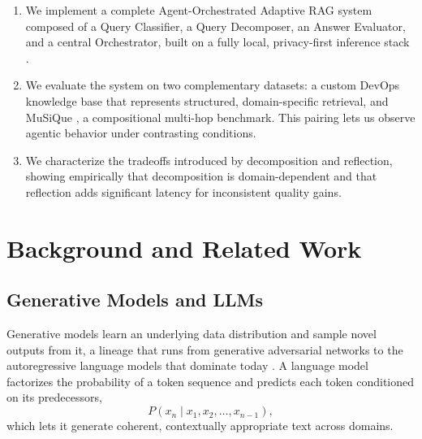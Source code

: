\documentclass[conference]{IEEEtran}
\begin{document}
\begin{enumerate}
  \item We implement a complete Agent-Orchestrated Adaptive RAG system composed of a Query Classifier, a Query Decomposer, an Answer Evaluator, and a central Orchestrator, built on a fully local, privacy-first inference stack \cite{meta2024llama3, gerganov2023gguf}.
  \item We evaluate the system on two complementary datasets: a custom DevOps knowledge base that represents structured, domain-specific retrieval, and MuSiQue \cite{trivedi2022musique}, a compositional multi-hop benchmark. This pairing lets us observe agentic behavior under contrasting conditions.
  \item We characterize the tradeoffs introduced by decomposition and reflection, showing empirically that decomposition is domain-dependent and that reflection adds significant latency for inconsistent quality gains.
\end{enumerate}

\section{Background and Related Work}

\subsection{Generative Models and LLMs}
Generative models learn an underlying data distribution and sample novel outputs from it, a lineage that runs from generative adversarial networks \cite{goodfellow2014gan, gui2021gansurvey} to the autoregressive language models that dominate today \cite{brown2020gpt3}. A language model factorizes the probability of a token sequence and predicts each token conditioned on its predecessors,
\begin{equation}
P(x_n \mid x_1, x_2, \ldots, x_{n-1}),
\end{equation}
which lets it generate coherent, contextually appropriate text across domains.
\end{document}
